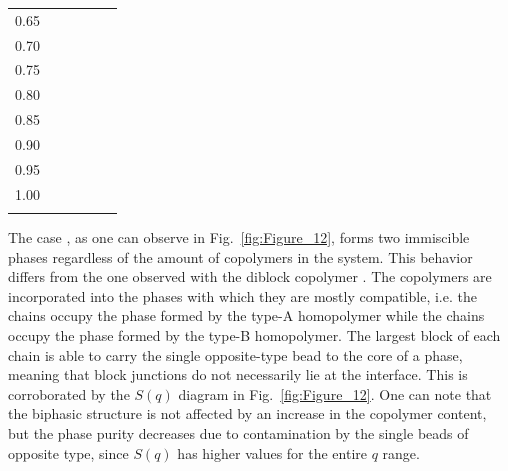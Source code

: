 \documentclass[
journal=mamobx,
manuscript=article,
]{achemso}
\newcommand{\biphasic}[0]{\cellcolor{blue^^2120}{biphasic}}
\newcommand{\lamellae}[0]{\cellcolor{cyan^^2120}{lamellae}}
\newcommand{\defectivelamellae}[0]{\cellcolor{green^^2120}{defective lamellae}}
\begin{document}
\begin{table}
\begin{tabular*}{\textwidth}{@{\extracolsep{\fill}}cccccc}
0.65 & \biphasic & \defectivelamellae & \defectivelamellae & \defectivelamellae & \defectivelamellae \\
0.70 & \biphasic & \defectivelamellae & \defectivelamellae & \defectivelamellae & \defectivelamellae \\
0.75 & \biphasic & \defectivelamellae & \lamellae & \lamellae & \lamellae \\
0.80 & \biphasic & \defectivelamellae & \lamellae & \lamellae & \lamellae \\
0.85 & \biphasic & \lamellae & \lamellae & \lamellae & \lamellae \\
0.90 & \biphasic & \lamellae & \lamellae & \lamellae & \lamellae \\
0.95 & \biphasic & \lamellae & \lamellae & \lamellae & \lamellae \\
1.00 & \biphasic & \lamellae & \lamellae & \lamellae & \lamellae \\
		\hline\hline
\label{table:dynamics}
\end{tabular*}
\end{table}

The case , as one can observe in Fig.~\ref{fig:Figure_12}, forms two immiscible phases regardless of the amount of copolymers in the system.
This behavior differs from the one observed with the diblock copolymer .
The copolymers are incorporated into the phases with which they are mostly compatible, i.e. the  chains occupy the phase formed by the type-A homopolymer while the  chains occupy the phase formed by the type-B homopolymer.
The largest block of each chain is able to carry the single opposite-type bead to the core of a phase, meaning that block junctions do not necessarily lie at the interface.
This is corroborated by the $S(q)$ diagram in Fig.~\ref{fig:Figure_12}.
One can note that the biphasic structure is not affected by an increase in the copolymer content, but the phase purity decreases due to contamination by the single beads of opposite type, since $S(q)$ has higher values for the entire $q$ range.
\end{document}
